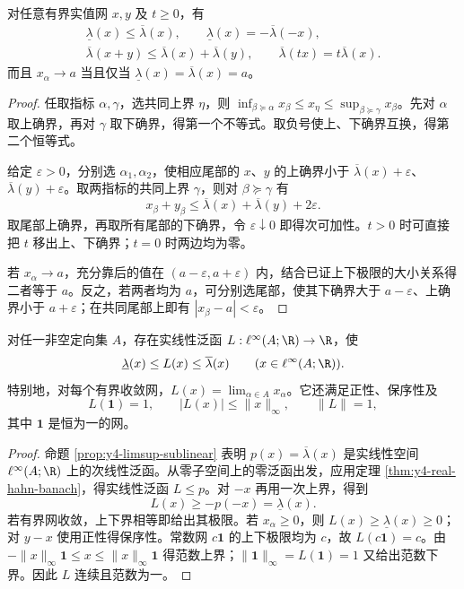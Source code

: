 \begin{proposition}[尾部控制与次线性]\label{prop:y4-limsup-sublinear}
对任意有界实值网 $x,y$ 及 $t\ge0$，有
\[
 \begin{gathered}
 \underline\lambda(x)\le\overline\lambda(x),\qquad
 \underline\lambda(x)=-\overline\lambda(-x),\\
 \overline\lambda(x+y)\le\overline\lambda(x)+\overline\lambda(y),\qquad
 \overline\lambda(tx)=t\overline\lambda(x).
 \end{gathered}
\]
而且 $x_\alpha\to a$ 当且仅当 $\underline\lambda(x)=\overline\lambda(x)=a$。
\end{proposition}
\begin{proof}
任取指标 $\alpha,\gamma$，选共同上界 $\eta$，则
$\inf_{\beta\succeq\alpha}x_\beta\le x_\eta\le\sup_{\beta\succeq\gamma}x_\beta$。先对 $\alpha$ 取上确界，再对 $\gamma$ 取下确界，得第一个不等式。取负号使上、下确界互换，得第二个恒等式。

给定 $\varepsilon>0$，分别选 $\alpha_1,\alpha_2$，使相应尾部的 $x$、$y$ 的上确界小于 $\overline\lambda(x)+\varepsilon$、$\overline\lambda(y)+\varepsilon$。取两指标的共同上界 $\gamma$，则对 $\beta\succeq\gamma$ 有
\[
 x_\beta+y_\beta\le\overline\lambda(x)+\overline\lambda(y)+2\varepsilon.
\]
取尾部上确界，再取所有尾部的下确界，令 $\varepsilon\downarrow0$ 即得次可加性。$t>0$ 时可直接把 $t$ 移出上、下确界；$t=0$ 时两边均为零。

若 $x_\alpha\to a$，充分靠后的值在 $(a-\varepsilon,a+\varepsilon)$ 内，结合已证上下极限的大小关系得二者等于 $a$。反之，若两者均为 $a$，可分别选尾部，使其下确界大于 $a-\varepsilon$、上确界小于 $a+\varepsilon$；在共同尾部上即有 $|x_\beta-a|<\varepsilon$。
\end{proof}

\begin{theorem}[有界实值网的广义极限泛函]\label{thm:y4-generalized-limit}
对任一非空定向集 $A$，存在实线性泛函 $L:\ell^\infty(A;\R)\to\R$，使
\[
 \underline\lambda(x)\le L(x)\le\overline\lambda(x)
 \qquad(x\in\ell^\infty(A;\R)).
\]
特别地，对每个有界收敛网，$L(x)=\lim_{\alpha\in A}x_\alpha$。它还满足正性、保序性及
\[
 L(\mathbf1)=1,\qquad |L(x)|\le\|x\|_\infty,\qquad \|L\|=1,
\]
其中 $\mathbf1$ 是恒为一的网。
\end{theorem}
\begin{proof}
命题 \ref{prop:y4-limsup-sublinear} 表明 $p(x)=\overline\lambda(x)$ 是实线性空间 $\ell^\infty(A;\R)$ 上的次线性泛函。从零子空间上的零泛函出发，应用定理 \ref{thm:y4-real-hahn-banach}，得实线性泛函 $L\le p$。对 $-x$ 再用一次上界，得到
\[
 L(x)\ge-p(-x)=\underline\lambda(x).
\]
若有界网收敛，上下界相等即给出其极限。若 $x_\alpha\ge0$，则 $L(x)\ge\underline\lambda(x)\ge0$；对 $y-x$ 使用正性得保序性。常数网 $c\mathbf1$ 的上下极限均为 $c$，故 $L(c\mathbf1)=c$。由
$-\|x\|_\infty\mathbf1\le x\le\|x\|_\infty\mathbf1$
得范数上界；$\|\mathbf1\|_\infty=L(\mathbf1)=1$ 又给出范数下界。因此 $L$ 连续且范数为一。
\end{proof}


